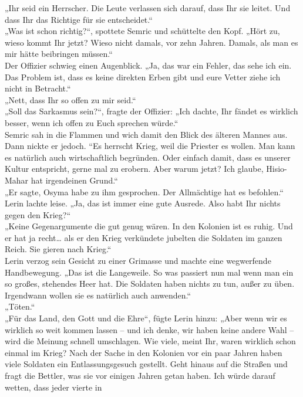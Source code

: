 „Ihr seid ein Herrscher. Die Leute verlassen sich darauf, dass Ihr sie leitet. Und dass Ihr 
das Richtige für sie entscheidet.“\\
„Was ist schon richtig?“, spottete Semric und schüttelte den Kopf. „Hört zu, wieso kommt Ihr jetzt? 
Wieso nicht damals, vor zehn Jahren. Damals, als man es mir hätte beibringen müssen.“\\
Der Offizier schwieg einen Augenblick. „Ja, das war ein Fehler, das sehe ich ein. Das Problem ist, 
dass es keine direkten Erben gibt und eure Vetter ziehe ich nicht in Betracht.“\\
„Nett, dass Ihr so offen zu mir seid.“\\
„Soll das Sarkasmus sein?“, fragte der Offizier: „Ich dachte, Ihr fändet es wirklich besser, wenn 
ich offen zu Euch sprechen würde.“\\
Semric sah in die Flammen und wich damit den Blick des älteren Mannes aus. Dann nickte er jedoch. 
``Es herrscht Krieg, weil die Priester es wollen. Man kann es natürlich auch wirtschaftlich 
begründen. Oder einfach damit, dass es unserer Kultur entspricht, gerne mal zu erobern. Aber warum 
jetzt? Ich glaube, Hisio-Mahar hat irgendeinen Grund.“\\
„Er sagte, Osyma habe zu ihm gesprochen. Der Allmächtige hat es befohlen.“\\
Lerin lachte leise. „Ja, das ist immer eine gute Ausrede. Also habt Ihr nichts gegen den Krieg?“\\
„Keine Gegenargumente die gut genug wären. In den Kolonien ist es ruhig. Und er hat ja recht… als er 
den Krieg verkündete jubelten die Soldaten im ganzen Reich. Sie gieren nach Krieg.“\\
Lerin verzog sein Gesicht zu einer Grimasse und machte eine wegwerfende Handbewegung. „Das ist die 
Langeweile. So was passiert nun mal wenn man ein so großes, stehendes Heer hat. Die Soldaten haben 
nichts zu tun, außer zu üben. Irgendwann wollen sie es natürlich auch anwenden.“\\
„Töten.“\\
„Für das Land, den Gott und die Ehre“, fügte Lerin hinzu: „Aber wenn wir es wirklich so weit kommen 
lassen – und ich denke, wir haben keine andere Wahl – wird die Meinung schnell umschlagen. Wie 
viele, meint Ihr, waren wirklich schon einmal im Krieg? Nach der Sache in den Kolonien vor ein paar 
Jahren haben viele Soldaten ein Entlassungsgesuch gestellt. Geht hinaus auf die Straßen und fragt 
die Bettler, was sie vor einigen Jahren getan haben. Ich würde darauf wetten, dass jeder vierte in 
